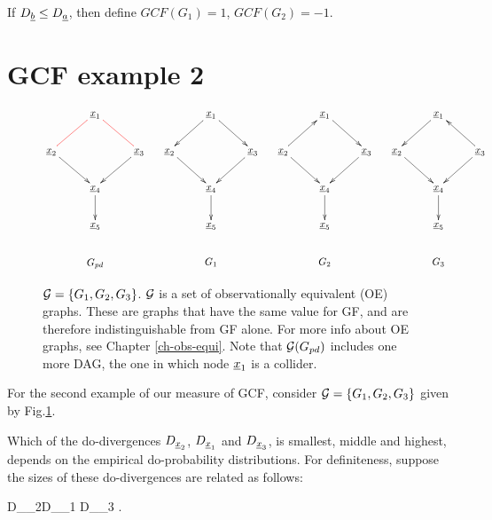 If $D_{\underline{b}}\leq  D_{\underline{a}}$, then define
$GCF(G_1)=1$, $GCF(G_2)=-1$.



\section{GCF example 2}

\begin{figure}[h!]
$$
\xymatrix{
&\rvx_1
\ar@[red]@{-}[dl]\ar@[red]@{-}[dr]
\\
\rvx_2\ar[dr]
&&\rvx_3\ar[dl]
\\
&\rvx_4\ar[d]
\\
&\rvx_5
\\
&G_{pd}
}
\;\;\;\;\;
\xymatrix{
&\rvx_1
\ar[dl]
\ar[dr]
\\
\rvx_2\ar[dr]
&&\rvx_3\ar[dl]
\\
&\rvx_4\ar[d]
\\
&\rvx_5
\\
&G_1
}
\;\;\;\;\;
\xymatrix{
&\rvx_1
\ar[dr]
\\
\rvx_2\ar[dr]\ar[ur]
&&\rvx_3\ar[dl]
\\
&\rvx_4\ar[d]
\\
&\rvx_5
\\
&G_2
}
\;\;\;\;\;
\xymatrix{
&\rvx_1
\ar[dl]
\\
\rvx_2\ar[dr]
&&\rvx_3\ar[dl]\ar[ul]
\\
&\rvx_4\ar[d]
\\
&\rvx_5
\\
&G_3
}
$$
\caption{${\cal G}=\{G_1, G_2, G_3\}$.
${\cal G}$ is a set of observationally
equivalent (OE) graphs. 
These are graphs that have the
same value for GF, and
are therefore indistinguishable
from GF alone. For more info about 
OE graphs, see Chapter
\ref{ch-obs-equi}.
Note that ${\cal G}(G_{pd})$
includes one more DAG,
the one in which node ${\underline{x}}_1$
is a collider.}
\label{fig-ob-eq-2}
\end{figure}

For the second example of
our measure of GCF,
consider 
${\cal G}=\{G_1, G_2, G_3\}$
given by Fig.\ref{fig-ob-eq-2}.

Which of the do-divergences
$D_{{\underline{x}}_2}$, $ D_{{\underline{x}}_1}$ and $D_{{\underline{x}}_3}$,
is smallest, middle and
highest, depends on the empirical
do-probability distributions.
For definiteness,
suppose the
sizes of these do-divergences
are related as follows:



\beq
D_{\rvx_2}\leq  D_{\rvx_1} \leq  D_{\rvx_3}
\;.
\eeq



